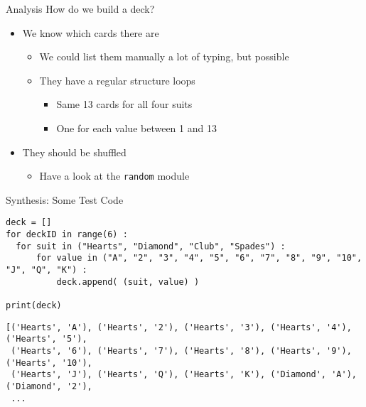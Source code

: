 \begin{frame}[fragile]{Analysis}
%
How do we build a deck?
%
\begin{itemize}
\item We know which cards there are
	\begin{itemize}
	\item We could list them manually \Thus a lot of typing, but possible
	\item They have a regular structure \Thus loops
		\begin{itemize}
		\item Same 13 cards for all four suits
		\item One for each value between 1 and 13
		\end{itemize}
	\end{itemize}
\item They should be shuffled
	\begin{itemize}
	\item Have a look at the \texttt{random} module
	\end{itemize}
\end{itemize}
%
\end{frame}


\begin{frame}[fragile]{Synthesis: Some Test Code}
%
\begin{codebox}
\begin{verbatim}
deck = []
for deckID in range(6) :
  for suit in ("Hearts", "Diamond", "Club", "Spades") :
      for value in ("A", "2", "3", "4", "5", "6", "7", "8", "9", "10", "J", "Q", "K") :
          deck.append( (suit, value) )

print(deck)
\end{verbatim}
\end{codebox}
%
\begin{cmdbox}
\begin{verbatim}
[('Hearts', 'A'), ('Hearts', '2'), ('Hearts', '3'), ('Hearts', '4'), ('Hearts', '5'),
 ('Hearts', '6'), ('Hearts', '7'), ('Hearts', '8'), ('Hearts', '9'), ('Hearts', '10'),
 ('Hearts', 'J'), ('Hearts', 'Q'), ('Hearts', 'K'), ('Diamond', 'A'), ('Diamond', '2'),
 ...
\end{verbatim}
\end{cmdbox}
%
\end{frame}

